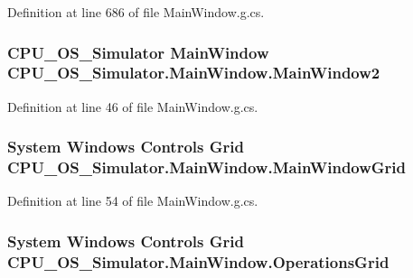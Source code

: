 Definition at line 686 of file Main\+Window.\+g.\+cs.

\hypertarget{class_c_p_u___o_s___simulator_1_1_main_window_adf996cda04d3cf426847b8fd8981ee66}{}
\subsubsection[{Main\+Window2}]{\setlength{\rightskip}{0pt plus 5cm}C\+P\+U\+\_\+\+O\+S\+\_\+\+Simulator {\bf Main\+Window} C\+P\+U\+\_\+\+O\+S\+\_\+\+Simulator.\+Main\+Window.\+Main\+Window2\hspace{0.3cm}{\ttfamily [package]}}\label{class_c_p_u___o_s___simulator_1_1_main_window_adf996cda04d3cf426847b8fd8981ee66}


Definition at line 46 of file Main\+Window.\+g.\+cs.

\hypertarget{class_c_p_u___o_s___simulator_1_1_main_window_a5c56d82a7b611446e81b7baa3229d76b}{}
\subsubsection[{Main\+Window\+Grid}]{\setlength{\rightskip}{0pt plus 5cm}System Windows Controls Grid C\+P\+U\+\_\+\+O\+S\+\_\+\+Simulator.\+Main\+Window.\+Main\+Window\+Grid\hspace{0.3cm}{\ttfamily [package]}}\label{class_c_p_u___o_s___simulator_1_1_main_window_a5c56d82a7b611446e81b7baa3229d76b}


Definition at line 54 of file Main\+Window.\+g.\+cs.

\hypertarget{class_c_p_u___o_s___simulator_1_1_main_window_ae4f2459995eb2f672c0fd3c2248b79fd}{}
\subsubsection[{Operations\+Grid}]{\setlength{\rightskip}{0pt plus 5cm}System Windows Controls Grid C\+P\+U\+\_\+\+O\+S\+\_\+\+Simulator.\+Main\+Window.\+Operations\+Grid\hspace{0.3cm}{\ttfamily [package]}}\label{class_c_p_u___o_s___simulator_1_1_main_window_ae4f2459995eb2f672c0fd3c2248b79fd}


